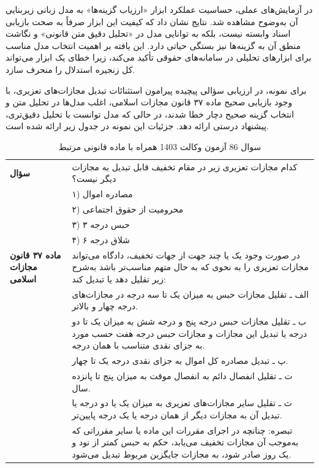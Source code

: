 \documentclass[12pt,a4paper]{report}
\begin{document}
	در آزمایش‌های عملی، حساسیت عملکرد ابزار «ارزیاب گزینه‌ها» به مدل زبانی زیربنایی آن به‌وضوح مشاهده شد. نتایج نشان داد که کیفیت این ابزار صرفاً به صحت بازیابی اسناد وابسته نیست، بلکه به توانایی مدل در «تحلیل دقیق متن قانونی» و نگاشت منطق آن به گزینه‌ها نیز بستگی حیاتی دارد. این یافته بر اهمیت انتخاب مدل مناسب برای ابزارهای تحلیلی در سامانه‌های حقوقی تأکید می‌کند، زیرا خطای یک ابزار می‌تواند کل زنجیره استدلال را منحرف سازد.
	
	برای نمونه، در ارزیابی سؤالی پیچیده پیرامون استثنائات تبدیل مجازات‌های تعزیری، با وجود بازیابی صحیح ماده ۳۷ قانون مجازات اسلامی، اغلب مدل‌ها در تحلیل متن و انتخاب گزینه صحیح دچار خطا شدند، در حالی که مدل  توانست با تحلیل دقیق‌تری، پیشنهاد درستی ارائه دهد. جزئیات این نمونه در جدول زیر ارائه شده است.
	
	\begin{table}[H]
		\centering
		\begin{tabular}{p{} p{}}
			\hline
			\textbf{سؤال} &
			کدام مجازات تعزیری زیر در مقام تخفیف قابل تبدیل به مجازات دیگر نیست؟\\
			& ۱) مصادره اموال \\
			& ۲) محرومیت از حقوق اجتماعی \\
			& ۳) حبس درجه ۳ \\
			& ۴) شلاق درجه ۶ \\ \hline
			\textbf{ماده ۳۷ قانون مجازات اسلامی} &
			\lr{}در صورت وجود یک یا چند جهت از جهات تخفیف، دادگاه می‌تواند مجازات تعزیری را به‌ نحوی که به حال متهم مناسب‌تر باشد به‌شرح زیر تقلیل دهد یا تبدیل کند: \\
			& الف ـ تقلیل مجازات حبس به میزان یک تا سه درجه در مجازات‌های درجه چهار و بالاتر. \\
			& ب ـ تقلیل مجازات حبس درجه پنج و درجه شش به میزان یک تا دو درجه یا تبدیل این مجازات و مجازات حبس درجه هفت حسب مورد به جزای نقدی متناسب با همان درجه. \\
			& پ ـ تبدیل مصادره کل اموال به جزای نقدی درجه یک تا چهار. \\
			& ت ـ تقلیل انفصال دائم به انفصال موقت به میزان پنج تا پانزده سال. \\
			& ث ـ تقلیل سایر مجازات‌های تعزیری به میزان یک یا دو درجه یا تبدیل آن به مجازات دیگر از همان درجه یا یک درجه پایین‌تر. \\
			& تبصره: چنانچه در اجرای مقررات این ماده یا سایر مقرراتی که به‌موجب آن مجازات تخفیف می‌یابد، حکم به حبس کمتر از نود و یک روز صادر شود، به مجازات جایگزین مربوط تبدیل می‌شود. \\ \hline
		\end{tabular}
		\caption{سوال 86 آزمون وکالت 1403 همراه با ماده قانونی مرتبط}
		\label{tab:option-verifier-article37}
	\end{table}
	
\end{document}
